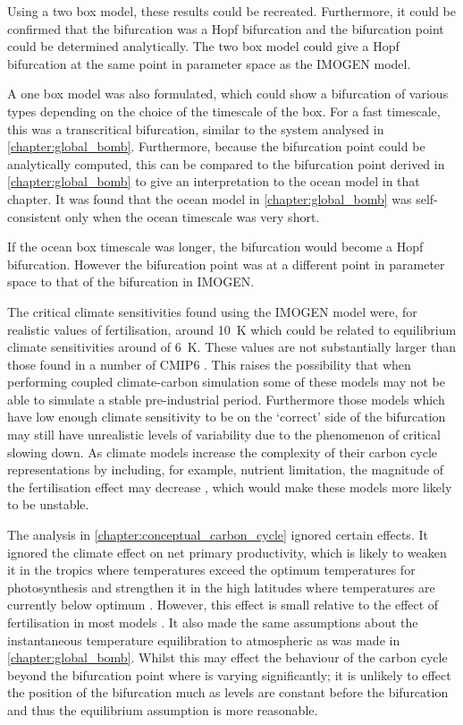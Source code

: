 Using a two box model, these results could be recreated. Furthermore, it could be confirmed that the bifurcation was a Hopf bifurcation and the bifurcation point
could be determined analytically. The two box model could give a Hopf bifurcation at the same point in parameter space as the IMOGEN model.

A one box model was also formulated, which could show a bifurcation of various types depending on the choice of the timescale of the box.
For a fast timescale, this was a transcritical bifurcation, similar to the system analysed in \cref{chapter:global_bomb}. Furthermore, because the bifurcation
point could be analytically computed, this can be compared to the bifurcation point derived in \cref{chapter:global_bomb} to give an interpretation to the
ocean model in that chapter. It was found that the ocean model in \cref{chapter:global_bomb} was self-consistent only when the ocean timescale was very short.

If the ocean box timescale was longer, the bifurcation would become a Hopf bifurcation. However the bifurcation point was at a different point in parameter space to that of the
bifurcation in IMOGEN.

The critical climate sensitivities found using the IMOGEN model were, for realistic values of  fertilisation, around \SI{10}{\kelvin} which could be
related to equilibrium climate sensitivities around of \SI{6}{\kelvin}. These values are not substantially larger than those found in a number of CMIP6 \parencite{Zelinka2020}.
This raises the possibility that when performing coupled climate-carbon simulation some of these models may not be able to simulate a stable pre-industrial
period. Furthermore those models which have low enough climate sensitivity to be on the `correct' side of the bifurcation may still have unrealistic levels of  variability
due to the phenomenon of critical slowing down. As climate models increase the complexity of their carbon cycle representations by including, for example,
nutrient limitation, the magnitude of the  fertilisation effect may decrease \parencite{Wiltshire2021}, which would make these models more likely to be unstable.

The analysis in \cref{chapter:conceptual_carbon_cycle} ignored certain effects. It ignored the climate effect on net primary productivity, which is likely to weaken it
in the tropics where temperatures exceed the optimum temperatures for photosynthesis and strengthen it in the high latitudes where temperatures are currently
below optimum \parencite{Sage2007}.
However, this effect is small relative to the effect of  fertilisation in most models \parencite{Arora2020}.
It also made the same assumptions about the instantaneous temperature equilibration to atmospheric  as was made in \cref{chapter:global_bomb}.
Whilst this may effect the behaviour of the carbon cycle beyond the bifurcation point where  is varying significantly;
it is unlikely to effect the position of the bifurcation much as  levels are constant before the bifurcation and thus the equilibrium assumption is more reasonable.

